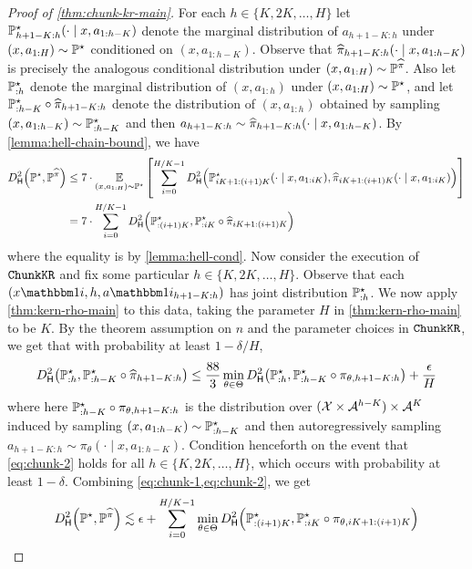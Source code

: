\begin{proof}[Proof of \cref{thm:chunk-kr-main}]
For each $h \in \{K,2K,\dots,H\}$ let $\mathbb{P}^\star_{h+1-K:h}(\cdot\mid{}x,a_{1:h-K})$ denote the marginal distribution of $a_{h+1-K:h}$ under $(x,a_{1:H}) \sim \mathbb{P}^\star$ conditioned on $(x,a_{1:h-K})$. Observe that $\widehat{\pi}_{h+1-K:h}(\cdot\mid{}x,a_{1:h-K})$ is precisely the analogous conditional distribution under $(x,a_{1:H}) \sim \mathbb{P}^{\widehat{\pi}}$. Also let $\mathbb{P}^\star_{:h}$ denote the marginal distribution of $(x, a_{1:h})$ under $(x,a_{1:H}) \sim \mathbb{P}^\star$, and let $\mathbb{P}^\star_{:h-K} \circ \widehat{\pi}_{h+1-K:h}$ denote the distribution of $(x,a_{1:h})$ obtained by sampling $(x,a_{1:h-K}) \sim \mathbb{P}^\star_{:h-K}$ and then $a_{h+1-K:h} \sim \widehat{\pi}_{h+1-K:h}(\cdot\mid{}x,a_{1:h-K})$. By \cref{lemma:hell-chain-bound}, we have
\begin{align} 
\Dhels{\BP^\star}{\BP^{\pihat}} 
&\leq 7 \cdot \EE_{(x,a_{1:H}) \sim \BP^\star}\left[\sum_{i=0}^{H/K-1} \Dhels{\BP^\star_{iK+1:(i+1)K}(\cdot\mid{}x,a_{1:iK})}{\pihat_{iK+1:(i+1)K}(\cdot\mid{}x,a_{1:iK})}\right] \\ 
&= 7 \cdot \sum_{i=0}^{H/K-1} \Dhels{\BP^\star_{:(i+1)K}}{\BP^\star_{:iK} \circ \pihat_{iK+1:(i+1)K}}\label{eq:chunk-1}
\end{align}
where the equality is by \cref{lemma:hell-cond}. Now consider the execution of $\texttt{ChunkKR}$ and fix some particular $h \in \{K,2K,\dots,H\}$. Observe that each $(x\ind{i,h}, a\ind{i}_{h+1-K:h})$ has joint distribution $\mathbb{P}^\star_{:h}$. We now apply \cref{thm:kern-rho-main} to this data, taking the parameter $H$ in \cref{thm:kern-rho-main} to be $K$. By the theorem assumption on $n$ and the parameter choices in $\texttt{ChunkKR}$, we get that with probability at least $1-\delta/H$, 
\begin{equation}
\Dhels{\BP^\star_{:h}}{\BP^\star_{:h-K} \circ \pihat_{h+1-K:h}} \leq \frac{88}{3} \min_{\theta \in \Theta} \Dhels{\BP^\star_{:h}}{\BP^\star_{:h-K} \circ \pi_{\theta,h+1-K:h}} + \frac{\epsilon}{H}\label{eq:chunk-2}
\end{equation}
where here $\mathbb{P}^\star_{:h-K} \circ \pi_{\theta,h+1-K:h}$ is the distribution over $(\mathcal{X} \times \mathcal{A}^{h-K}) \times \mathcal{A}^K$ induced by sampling $(x,a_{1:h-K}) \sim \mathbb{P}^\star_{:h-K}$ and then autoregressively sampling $a_{h+1-K:h} \sim \pi_\theta(\cdot\mid{}x,a_{1:h-K})$. Condition henceforth on the event that \cref{eq:chunk-2} holds for all $h \in \{K,2K,\dots,H\}$, which occurs with probability at least $1-\delta$. Combining \cref{eq:chunk-1,eq:chunk-2}, we get
\begin{align}
\Dhels{\BP^\st}{\BP^{\pihat}}
&\lesssim \epsilon + \sum_{i=0}^{H/K-1} \min_{\theta\in\Theta} \Dhels{\BP^\st_{:(i+1)K}}{\BP^\st_{:iK} \circ \pi_{\theta,iK+1:(i+1)K}} \\ 

\end{align}
\end{proof}
